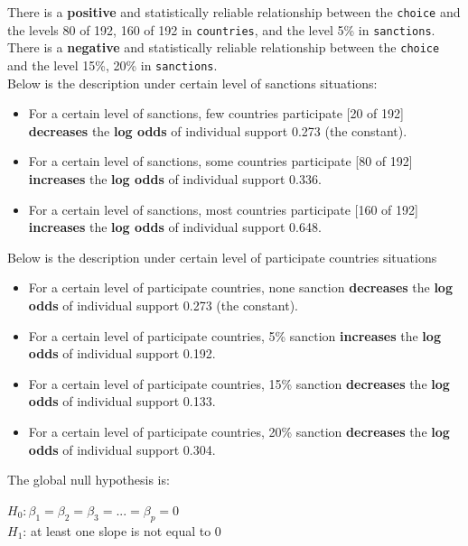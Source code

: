 \documentclass{article} %
\begin{document}
\noindent There is a \textbf{positive} and statistically reliable relationship between the \texttt{choice} and the levels 80 of 192, 160 of 192 in \texttt{countries}, and the level  5\% in \texttt{sanctions}. There is a \textbf{negative} and statistically reliable relationship between the \texttt{choice} and the level 15\%, 20\% in \texttt{sanctions}.\\
Below is the description under certain level of sanctions situations:
\begin{itemize}
	\item For a certain level of sanctions, few countries participate [20 of 192] \textbf{decreases} the \textbf{log odds} of individual support 0.273 (the constant).
	\item For a certain level of sanctions, some countries participate [80 of 192] \textbf{increases} the \textbf{log odds} of individual support 0.336.
	\item For a certain level of sanctions, most countries participate [160 of 192] \textbf{increases} the \textbf{log odds} of individual support 0.648.
\end{itemize}
Below is the description under certain level of participate countries situations
\begin{itemize}
	\item For a certain level of participate countries, none sanction \textbf{decreases} the \textbf{log odds} of individual support 0.273 (the constant).
	\item For a certain level of participate countries, 5\% sanction \textbf{increases} the \textbf{log odds} of individual support 0.192.
	\item For a certain level of participate countries, 15\% sanction \textbf{decreases} the \textbf{log odds} of individual support 0.133.
	\item For a certain level of participate countries, 20\% sanction \textbf{decreases} the \textbf{log odds} of individual support 0.304.
\end{itemize}

\newpage

\noindent The global null hypothesis is: \\
\begin{center}
	$H_0: \beta_1 = \beta_2 = \beta_3 = ... = \beta_p = 0$ \\
	$H_1$: at least one slope is not equal to 0 \\
\end{center}

 
\end{document}
